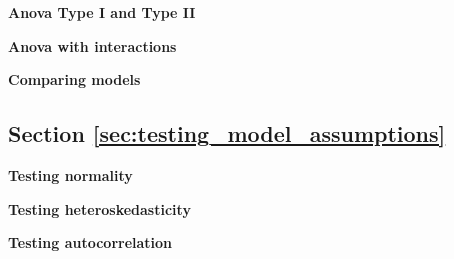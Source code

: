 \begin{exercise}
\label{ex:anova.mod.1}

\textbf{Anova Type I and Type II}





\end{exercise}

\begin{exercise}
\label{ex:anova.mod.3}

\textbf{Anova with interactions}



\end{exercise}

\begin{exercise}
\label{ex:comparing_models}

\textbf{Comparing models}




\end{exercise}

\subsection{Section \ref{sec:testing_model_assumptions}}

\begin{exercise}
\label{ex:normality_test}

\textbf{Testing normality}





\end{exercise}

\begin{exercise}
\label{ex:breusch_pagan}

\textbf{Testing heteroskedasticity}




\end{exercise}

\begin{exercise}
\label{ex:breusch_godfrey_test}

\textbf{Testing autocorrelation}




\end{exercise}

